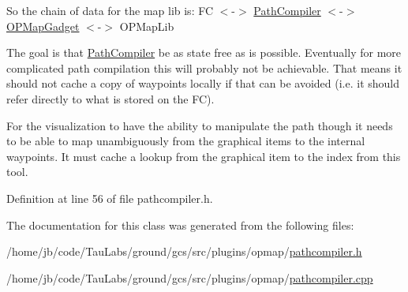 \-So the chain of data for the map lib is\-: \-F\-C $<$-\/$>$ \hyperlink{class_path_compiler}{\-Path\-Compiler} $<$-\/$>$ \hyperlink{class_o_p_map_gadget}{\-O\-P\-Map\-Gadget} $<$-\/$>$ \-O\-P\-Map\-Lib

\-The goal is that \hyperlink{class_path_compiler}{\-Path\-Compiler} be as state free as is possible. \-Eventually for more complicated path compilation this will probably not be achievable. \-That means it should not cache a copy of waypoints locally if that can be avoided (i.\-e. it should refer directly to what is stored on the \-F\-C).

\-For the visualization to have the ability to manipulate the path though it needs to be able to map unambiguously from the graphical items to the internal waypoints. \-It must cache a lookup from the graphical item to the index from this tool. 

\-Definition at line 56 of file pathcompiler.\-h.



\-The documentation for this class was generated from the following files\-:\begin{DoxyCompactItemize}
\item 
/home/jb/code/\-Tau\-Labs/ground/gcs/src/plugins/opmap/\hyperlink{pathcompiler_8h}{pathcompiler.\-h}\item 
/home/jb/code/\-Tau\-Labs/ground/gcs/src/plugins/opmap/\hyperlink{pathcompiler_8cpp}{pathcompiler.\-cpp}\end{DoxyCompactItemize}
